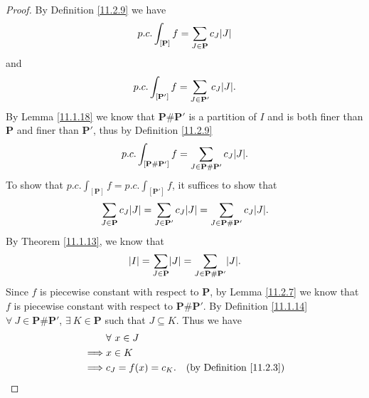 \begin{proof}
    By Definition \ref{11.2.9} we have
    \[
        p.c. \int_{[\mathbf{P}]} f = \sum_{J \in \mathbf{P}} c_J \abs*{J}
    \]
    and
    \[
        p.c. \int_{[\mathbf{P}']} f = \sum_{J \in \mathbf{P}'} c_J \abs*{J}.
    \]
    By Lemma \ref{11.1.18} we know that \(\mathbf{P} \# \mathbf{P}'\) is a partition of \(I\) and is both finer than \(\mathbf{P}\) and finer than \(\mathbf{P}'\), thus by Definition \ref{11.2.9}
    \[
        p.c. \int_{[\mathbf{P} \# \mathbf{P}']} f = \sum_{J \in \mathbf{P} \# \mathbf{P}'} c_J \abs*{J}.
    \]
    To show that \(p.c. \int_{[\mathbf{P}]} f = p.c. \int_{[\mathbf{P}']} f\), it suffices to show that
    \[
        \sum_{J \in \mathbf{P}} c_J \abs*{J} = \sum_{J \in \mathbf{P}'} c_J \abs*{J} = \sum_{J \in \mathbf{P} \# \mathbf{P}'} c_J \abs*{J}.
    \]
    By Theorem \ref{11.1.13}, we know that
    \[
        \abs*{I} = \sum_{J \in \mathbf{P}} \abs*{J} = \sum_{J \in \mathbf{P} \# \mathbf{P}'} \abs*{J}.
    \]
    Since \(f\) is piecewise constant with respect to \(\mathbf{P}\), by Lemma \ref{11.2.7} we know that \(f\) is piecewise constant with respect to \(\mathbf{P} \# \mathbf{P}'\).
    By Definition \ref{11.1.14} \(\forall\ J \in \mathbf{P} \# \mathbf{P}'\), \(\exists\ K \in \mathbf{P}\) such that \(J \subseteq K\).
    Thus we have
    \begin{align*}
                 & \forall\ x \in J                                        \\
        \implies & x \in K                                                 \\
        \implies & c_J = f(x) = c_K. & \text{(by Definition \ref{11.2.3})}
    \end{align*}
\end{proof}